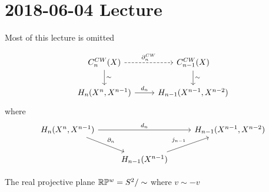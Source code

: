 \section{2018-06-04 Lecture}

Most of this lecture is omitted

\begin{equation*}
  \begin{tikzcd}
    C_n^{CW}(X) \ar[r, dashed, "\p_n^{CW}"] \ar[d, "\sim"] & C_{n-1}^{CW}(X) \ar[d, "\sim"] \\
    H_n(X^n,X^{n-1}) \ar[r, "d_n"] & H_{n-1}(X^{n-1},X^{n-2})
  \end{tikzcd}
\end{equation*}
where
\begin{equation*}
  \begin{tikzcd}
    H_n(X^n,X^{n-1}) \ar[rr, "d_n"] \ar[dr, "\p_n"] & & H_{n-1}(X^{n-1},X^{n-2}) \\
    & H_{n-1}(X^{n-1}) \ar[ur, "j_{n-1}"]
  \end{tikzcd}
\end{equation*}

The real projective plane
$\mathbb{R}\mathbb{P}^w=S^2/\sim$ where $v \sim -v$
